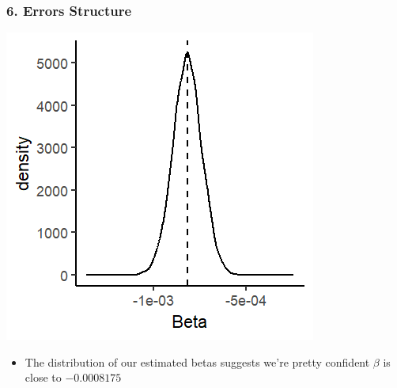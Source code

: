 \documentclass[xcolor=x11names,compress]{beamer}\usepackage[]{graphicx}\usepackage[]{color}
\makeatletter
\def\maxwidth{ %
  \ifdim\Gin@nat@width>\linewidth
    \linewidth
  \else
    \Gin@nat@width
  \fi
}
\newenvironment{knitrout}{}{} %
\renewcommand{\(}{\begin{columns}}
\renewcommand{\)}{\end{columns}}
\newcommand{\<}[1]{\begin{column}{#1}}
\renewcommand{\>}{\end{column}}
\makeatother
\begin{document}
\begin{frame}
\frametitle{6. Errors Structure}
\begin{multicols}{2}
\begin{knitrout}
\color{fgcolor}
\includegraphics[width=\maxwidth]{figure/beta_dist_errors_4-1} 

\end{knitrout}
\columnbreak
\begin{itemize}
\item The distribution of our estimated betas suggests we're pretty confident $\beta$ is close to $-0.0008175$
\end{itemize}
\end{multicols}
\end{frame}
\end{document}
